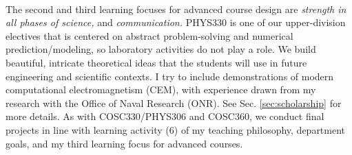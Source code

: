 \documentclass[../../../main.tex]{subfiles}
\begin{document}
\\
\vspace{0.15cm}
The second and third learning focuses for advanced course design are \textit{strength in all phases of science,} and \textit{communication.}  PHYS330 is one of our upper-division electives that is centered on abstract problem-solving and numerical prediction/modeling, so laboratory activities do not play a role.  We build beautiful, intricate theoretical ideas that the students will use in future engineering and scientific contexts.  I try to include demonstrations of modern computational electromagnetism (CEM), with experience drawn from my research with the Office of Naval Research (ONR).  See Sec. \ref{sec:scholarship} for more details.  As with COSC330/PHYS306 and COSC360, we conduct final projects in line with learning activity (6) of my teaching philosophy, department goals, and my third learning focus for advanced courses.
\end{document}
